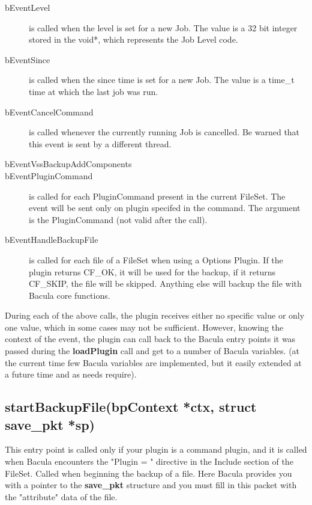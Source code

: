 \begin{description}
 \item [bEventLevel] is called when the level is set for a new Job. The value
   is a 32 bit integer stored in the void*, which represents the Job Level code.

 \item [bEventSince] is called when the since time is set for a new Job. The
   value is a time\_t time at which the last job was run.

\item [bEventCancelCommand] is called whenever the currently
  running Job is cancelled. Be warned that this event is sent by a different
  thread.

\item [bEventVssBackupAddComponents]

\item [bEventPluginCommand] is called for each PluginCommand present in the
  current FileSet.  The event will be sent only on plugin specifed in the
  command.  The argument is the PluginCommand (not valid after the call).

\item [bEventHandleBackupFile] is called for each file of a FileSet when
  using a Options Plugin.  If the plugin returns CF\_OK, it will be used
  for the backup, if it returns CF\_SKIP, the file will be skipped.
  Anything else will backup the file with Bacula core functions.
\end{description}

During each of the above calls, the plugin receives either no specific value or
only one value, which in some cases may not be sufficient.  However, knowing
the context of the event, the plugin can call back to the Bacula entry points
it was passed during the {\bf loadPlugin} call and get to a number of Bacula
variables.  (at the current time few Bacula variables are implemented, but it
easily extended at a future time and as needs require).

\subsection{startBackupFile(bpContext *ctx, struct save\_pkt *sp)}
This entry point is called only if your plugin is a command plugin, and
it is called when Bacula encounters the "Plugin = " directive in
the Include section of the FileSet.
Called when beginning the backup of a file. Here Bacula provides you
with a pointer to the {\bf save\_pkt} structure and you must fill in
this packet with the "attribute" data of the file.

